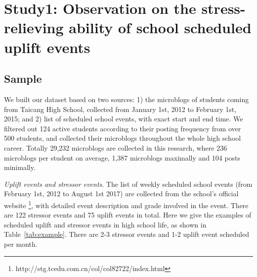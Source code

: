 \section{Study1: Observation on the stress-relieving ability of school scheduled uplift events}

\subsection{Sample}
We built our dataset based on two sources: 1) the microblogs of students coming from Taicang High School,
collected from January 1st, 2012 to February 1st, 2015;
and 2) list of scheduled school events, with exact start and end time.
We filtered out 124 active students according to their posting frequency from over 500 students,
and collected their microblogs throughout the whole high school career. Totally 29,232 microblogs are collected in this research,
where 236 microblogs per student on average, 1,387 microblogs maximally and 104 posts minimally.

\emph{Uplift events and stressor events}.
The list of weekly scheduled school events (from February 1st, 2012 to August 1st 2017) are collected from the school's official website
\footnote{http://stg.tcedu.com.cn/col/col82722/index.html}, with detailed event description and grade involved in the event.
There are 122 stressor events and 75 uplift events in total.
Here we give the examples of scheduled uplift and stressor events in high school life, as shown in Table~\ref{tab:example}.
There are 2-3 stressor events and 1-2 uplift event scheduled per month.

\begin{table}[H]
\caption{\small{Examples of school scheduled uplifts and stressor events.}}
\label{tab:example}
\end{table}

